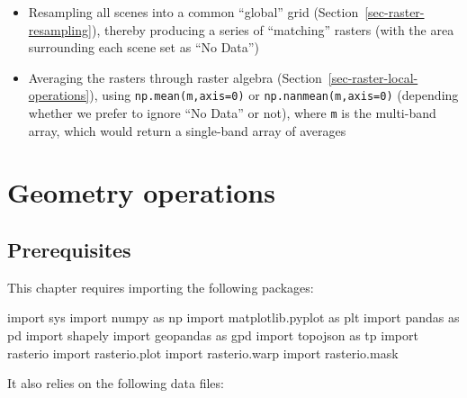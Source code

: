 \documentclass[
  letterpaper,
]{krantz}
\newenvironment{Shaded}{\begin{snugshade}}{\end{snugshade}}
\newcommand{\ImportTok}[1]{\textcolor[rgb]{0.00,0.46,0.62}{#1}}
\newcommand{\NormalTok}[1]{\textcolor[rgb]{0.00,0.23,0.31}{#1}}
\providecommand{\tightlist}{%
  \setlength{\itemsep}{0pt}\setlength{\parskip}{0pt}}\usepackage{longtable,booktabs,array}
\begin{document}
\begin{itemize}
\tightlist
\item
  Resampling all scenes into a common ``global'' grid
  (Section~\ref{sec-raster-resampling}), thereby producing a series of
  ``matching'' rasters (with the area surrounding each scene set as ``No
  Data'')
\item
  Averaging the rasters through raster algebra
  (Section~\ref{sec-raster-local-operations}), using
  \texttt{np.mean(m,axis=0)} or \texttt{np.nanmean(m,axis=0)} (depending
  whether we prefer to ignore ``No Data'' or not), where \texttt{m} is
  the multi-band array, which would return a single-band array of
  averages
\end{itemize}


\chapter{Geometry operations}\label{sec-geometric-operations}

\section*{Prerequisites}\label{prerequisites-3}


This chapter requires importing the following packages:

\begin{Shaded}
\begin{Highlighting}[]
\ImportTok{import}\NormalTok{ sys}
\ImportTok{import}\NormalTok{ numpy }\ImportTok{as}\NormalTok{ np}
\ImportTok{import}\NormalTok{ matplotlib.pyplot }\ImportTok{as}\NormalTok{ plt}
\ImportTok{import}\NormalTok{ pandas }\ImportTok{as}\NormalTok{ pd}
\ImportTok{import}\NormalTok{ shapely}
\ImportTok{import}\NormalTok{ geopandas }\ImportTok{as}\NormalTok{ gpd}
\ImportTok{import}\NormalTok{ topojson }\ImportTok{as}\NormalTok{ tp}
\ImportTok{import}\NormalTok{ rasterio}
\ImportTok{import}\NormalTok{ rasterio.plot}
\ImportTok{import}\NormalTok{ rasterio.warp}
\ImportTok{import}\NormalTok{ rasterio.mask}
\end{Highlighting}
\end{Shaded}

It also relies on the following data files:
\end{document}

